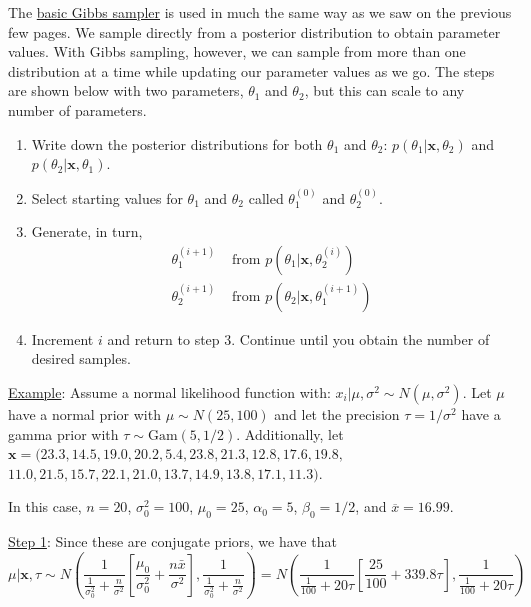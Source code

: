 \documentclass[11pt]{article}
\begin{document}
The \uline{basic Gibbs sampler} is used in much the same way as we saw on the previous few pages. We sample directly from a posterior distribution to obtain parameter values. With Gibbs sampling, however, we can sample from more than one distribution at a time while updating our parameter values as we go. The steps are shown below with two parameters, $\theta_1$ and $\theta_2$, but this can scale to any number of parameters.
\begin{enumerate}
\item Write down the posterior distributions for both $\theta_1$ and $\theta_2$: $p(\theta_1|\boldsymbol{x},\theta_2)$ and $p(\theta_2|\boldsymbol{x},\theta_1)$.
\item Select starting values for $\theta_1$ and $\theta_2$ called $\theta_1^{(0)}$ and $\theta_2^{(0)}$.
\item Generate, in turn,\\
\begin{align*}
\theta_1^{(i+1)}& \text{ from } p\left(\theta_1|\boldsymbol{x},\theta_2^{(i)}\right)\\
\theta_2^{(i+1)}& \text{ from } p\left(\theta_2|\boldsymbol{x},\theta_1^{(i+1)}\right)
\end{align*}
\item Increment $i$ and return to step 3. Continue until you obtain the number of desired samples.\\
\end{enumerate}

\underline{Example}: Assume a normal likelihood function with: $x_i|\mu,\sigma^2\sim N(\mu,\sigma^2)$. Let $\mu$ have a normal prior with $\mu\sim N(25,100)$ and let the precision $\tau=1/\sigma^2$ have a gamma prior with $\tau\sim \text{Gam}(5,1/2)$. Additionally, let $\boldsymbol{x}=(23.3, 14.5, 19.0, 20.2,  5.4, 23.8, 21.3, 12.8, 17.6, 19.8,$\\
$ 11.0, 21.5, 15.7, 22.1, 21.0, 13.7, 14.9, 13.8, 17.1, 11.3)$.

In this case, $n=20$, $\sigma^2_0=100$, $\mu_0=25$, $\alpha_0=5$, $\beta_0=1/2$, and $\overline{x}=16.99$.

\uline{Step 1}: Since these are conjugate priors, we have that\\
$\mu|\boldsymbol{x},\tau\sim N\left(\dfrac{1}{\frac{1}{\sigma^2_0}+\frac{n}{\sigma^2}}\left[\dfrac{\mu_0}{\sigma^2_0}+\dfrac{n\bar{x}}{\sigma^2}\right],\dfrac{1}{\frac{1}{\sigma^2_0}+\frac{n}{\sigma^2}}\right)=N\left(\dfrac{1}{\frac{1}{100}+20\tau}\left[\dfrac{25}{100}+339.8\tau\right],\dfrac{1}{\frac{1}{100}+20\tau}\right)$\\
\end{document}
